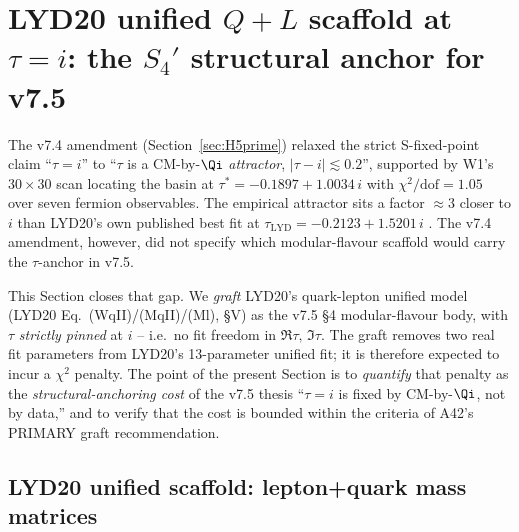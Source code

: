 
\section{LYD20 unified $Q+L$ scaffold at $\tau=i$:
         the $S_4'$ structural anchor for v7.5}
\label{sec:v75_lyd20_graft}

The v7.4 amendment (Section~\ref{sec:H5prime}) relaxed the strict
S-fixed-point claim ``$\tau=i$'' to ``$\tau$ is a CM-by-$\Qi$
\emph{attractor}, $|\tau-i|\lesssim 0.2$'', supported by W1's
$30\times 30$ scan locating the basin at $\tau^{*}=-0.1897+1.0034\,i$
with $\chi^{2}/\text{dof}=1.05$ over seven fermion observables.
The empirical attractor sits a factor $\approx\!3$ closer to $i$ than
LYD20's own published best fit at $\tau_{\text{LYD}}=-0.2123+1.5201\,i$
\cite{LYD20}.  The v7.4 amendment, however, did not specify which
modular-flavour scaffold would carry the $\tau$-anchor in v7.5.

This Section closes that gap.  We \emph{graft} LYD20's quark-lepton
unified model (LYD20 Eq.~(WqII)/(MqII)/(Ml), \cite{LYD20} \S V) as
the v7.5 §4 modular-flavour body, with $\tau$ \emph{strictly pinned}
at $i$ -- i.e.\ no fit freedom in $\Re\tau,\,\Im\tau$.  The graft
removes two real fit parameters from LYD20's 13-parameter unified fit;
it is therefore expected to incur a $\chi^{2}$ penalty.  The point of
the present Section is to \emph{quantify} that penalty as the
\emph{structural-anchoring cost} of the v7.5 thesis ``$\tau=i$ is fixed
by CM-by-$\Qi$, not by data,'' and to verify that the cost is bounded
within the criteria of A42's PRIMARY graft recommendation.

\subsection{LYD20 unified scaffold: lepton+quark mass matrices}
\label{sec:v75_scaffold}

